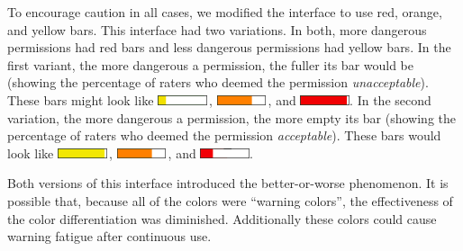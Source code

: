 \documentclass[11pt]{article}
\begin{document}
To encourage caution in all cases, we modified the interface to use 
red, orange, and yellow bars. This interface had 
two variations. In both, more dangerous permissions had red
bars and less dangerous permissions had yellow bars. In the first variant, the more 
dangerous a permission, the fuller its bar would be (showing the percentage of 
raters who deemed the permission \emph{unacceptable}). These bars might look like \includegraphics[height=8pt]{img/Bars3/RedBig/YellowWhiteBar.png}\,,
\includegraphics[height=8pt]{img/Bars3/RedBig/OrangeWhiteBar.png}\,, and 
\includegraphics[height=8pt]{img/Bars3/RedBig/RedWhiteBar.png}. In the second variation, the more
dangerous a permission, the more empty its bar (showing the percentage of raters who 
deemed the permission \emph{acceptable}). These bars would look like 
\includegraphics[height=8pt]{img/Bars3/RedSmall/YellowWhiteBar.png}\,,
\includegraphics[height=8pt]{img/Bars3/RedSmall/OrangeWhiteBar.png}\,, and
\includegraphics[height=8pt]{img/Bars3/RedSmall/RedWhiteBar.png}.

Both versions of this interface introduced the 
better-or-worse phenomenon. It is possible that,
because all of the colors were ``warning colors'', the effectiveness of the color 
differentiation was diminished. Additionally
these colors could cause warning fatigue after continuous use.
\end{document}
